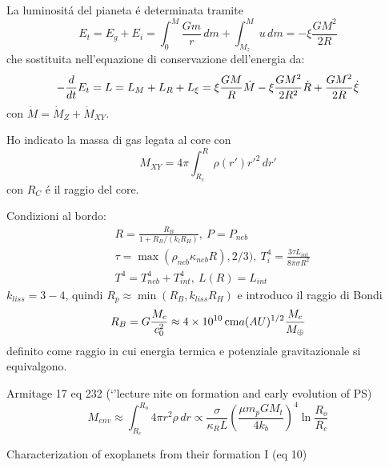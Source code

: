 La luminosit\'a del pianeta \'e determinata tramite
\begin{equation}
E_t=E_g+E_i=\int_0^M\frac{Gm}{r}\,dm+\int_{M_z}^Mu\,dm=-\xi\frac{GM^2}{2R}
\end{equation}
che sostituita nell'equazione di conservazione dell'energia da:
\begin{equation}
-\frac{d}{d t}E_t=L=L_M+L_R+L_{\xi}=\xi\frac{GM}{R}\dot{M}-\xi\frac{GM^2}{2R^2}\dot{R}+\frac{GM^2}{2R}\dot{\xi}
\end{equation}
con $\dot{M}=\dot{M}_Z+\dot{M}_{XY}$.

Ho indicato la massa di gas legata al core con
\begin{equation}
M_{XY}=4\pi\int_{R_c}^R\rho(r')r'^2\,dr'
\end{equation}
con $R_C$ \'e il raggio del core.

Condizioni al bordo:
\begin{align}
&R=\frac{R_B}{1+R_B/(k_lR_H )},\ P=P_{neb}\\
&\tau=\max{(\rho_{neb}\kappa_{neb}R),2/3)},\ T_i^4=\frac{3\tau L_{int}}{8\pi\sigma R^2}\\
&T^4=T_{neb}^4+T_{int}^4,\ L(R)=L_{int}
\end{align}
$k_{liss}=3-4$, quindi $R_p\approx \min{(R_B,k_{liss}R_H)}$ e introduco il raggio di Bondi
\begin{equation}
R_B=G\frac{M_c}{c_0^2}\approx\SI{4e10}{\cm}a(AU)\expy{1/2}\frac{M_c}{\mearth{}}
\end{equation}
definito come raggio in cui energia termica e potenziale gravitazionale si equivalgono.%

\begin{workout}
Armitage 17 eq 232 (`'lecture nite on formation and early evolution of PS)
\begin{equation}
M_{env}\approx\int_{R_c}^{R_o}4\pi r^2\rho\,dr\propto\frac{\sigma}{\kappa_RL}(\frac{\mu m_pGM_t}{4k_b})^4\ln{\frac{R_o}{R_c}}
\end{equation}
\end{workout}

\begin{workout}

\end{workout}


\begin{workout}
Characterization of exoplanets from their formation I (eq 10)
\end{workout}

